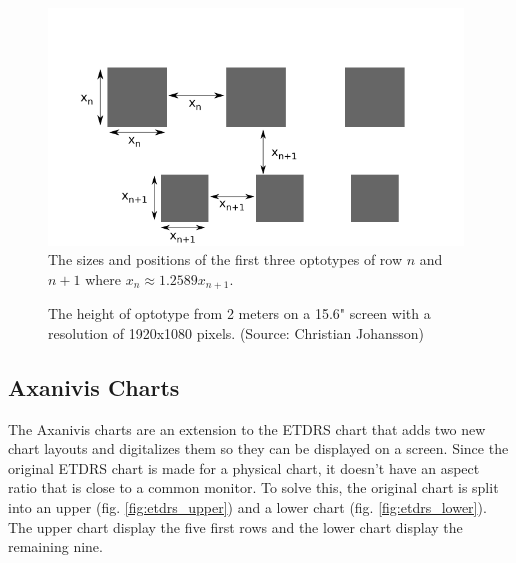 \documentclass[12pt,a4paper,notitlepage]{report}
\begin{document}
\begin{figure}[ht!]
\centering
\includegraphics[width=110mm]{images/etdrs_chart_sizes.png}
\caption{The sizes and positions of the first three optotypes of row $n$ and $n+1$ where $x_n \approx 1.2589 x_{n+1}$. \label{fig:etdrs_chart_sizes}}
\end{figure} 

\begin{figure}[ht!]
\caption{The height of optotype from 2 meters on a 15.6" screen with a resolution of 1920x1080 pixels. (Source: Christian Johansson)\label{fig:chart_size_plot}}
\end{figure}

\subsection{Axanivis Charts}
The Axanivis charts are an extension to the ETDRS chart that adds two new chart layouts and digitalizes them so they can be displayed on a screen. Since the original ETDRS chart is made for a physical chart, it doesn't have an aspect ratio \cite{Ferris} that is close to a common monitor. To solve this, the original chart is split into an upper (fig. \ref{fig:etdrs_upper}) and a lower chart (fig. \ref{fig:etdrs_lower}). The upper chart display the five first rows and the lower chart display the remaining nine.
\end{document}
